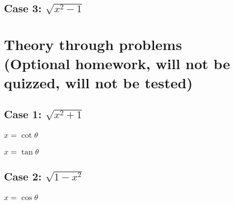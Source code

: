 {\subsection{Case 3: $\sqrt{x^2-1}$}
\item 
\section{Theory through problems (Optional homework, will not be quizzed, will not be tested)}
\subsection{Case 1: $\sqrt{x^2+1}$}
\subsubsection{$x=\cot \theta$}
\item 

\item 

\subsubsection{$x=\tan \theta$}
\item 

\item 
\subsection{Case 2: $\sqrt{1-x^2}$}
\subsubsection{$x=\cos \theta$}
\item 

\item 

}

